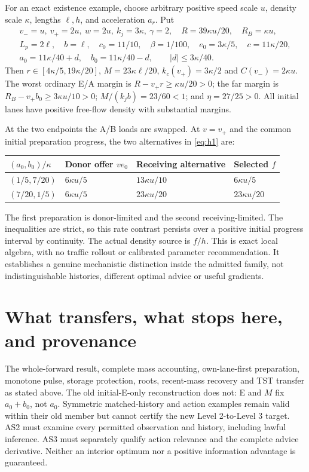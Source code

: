 \documentclass[11pt,a4paper]{article}
\newcommand{\kc}{k_c}
\begin{document}
For an exact existence example, choose arbitrary positive speed scale $u$,
density scale $\kappa$, lengths $\ell,h$, and acceleration $a_r$. Put
\begin{equation}
 \begin{gathered}
 v_-=u,\ v_+=2u,\ w=2u,\ k_j=3\kappa,\ \gamma=2,
 \quad R=39\kappa u/20,\quad R_B=\kappa u,\\
 L_p=2\ell,\quad b=\ell,\quad
 c_0=11/10,\quad\beta=1/100,\quad
 e_0=3\kappa/5,\quad c=11\kappa/20,\\
 a_0=11\kappa/40+d,\quad b_0=11\kappa/40-d,
 \qquad |d|\leq3\kappa/40.
 \end{gathered} \label{eq:example}
\end{equation}
Then $r\in[4\kappa/5,19\kappa/20]$,
$M=23\kappa\ell/20$, $\kc(v_+)=3\kappa/2$ and $C(v_-)=2\kappa u$.
The worst ordinary E/A margin is
$R-v_+r\geq\kappa u/20>0$; the far margin is
$R_B-v_+b_0\geq3\kappa u/10>0$;
$M/(k_jb)=23/60<1$; and $\eta=27/25>0$.
All initial lanes have positive free-flow density with substantial margins.

At the two endpoints the A/B loads are swapped. At $v=v_+$ and the common
initial preparation progress, the two alternatives in \eqref{eq:h1} are:
\begin{center}
\begin{tabular}{llll}
\toprule
$(a_0,b_0)/\kappa$ & Donor offer $ve_0$ & Receiving alternative & Selected $f$\\
\midrule
$(1/5,7/20)$ & $6\kappa u/5$ & $13\kappa u/10$ & $6\kappa u/5$\\
$(7/20,1/5)$ & $6\kappa u/5$ & $23\kappa u/20$ & $23\kappa u/20$\\
\bottomrule
\end{tabular}\end{center}
The first preparation is donor-limited and the second receiving-limited.
The inequalities are strict, so this rate contrast persists over a positive
initial progress interval by continuity. The actual density source is
$f/h$. This is exact local algebra, with no traffic rollout or calibrated
parameter recommendation. It establishes a genuine mechanistic distinction
inside the admitted family, not indistinguishable histories, different
optimal advice or useful gradients.

\section{What transfers, what stops here, and provenance}
The whole-forward result, complete mass accounting, own-lane-first
preparation, monotone pulse, storage protection, roots, recent-mass recovery
and TST transfer as stated above. The old initial-E-only reconstruction
does not: E and $M$ fix $a_0+b_0$, not $a_0$. Symmetric matched-history and
action examples remain valid within their old member but cannot certify
the new Level 2-to-Level 3 target. AS2 must examine every permitted
observation and history, including lawful inference. AS3 must separately
qualify action relevance and the complete advice derivative. Neither an
interior optimum nor a positive information advantage is guaranteed.
\end{document}
